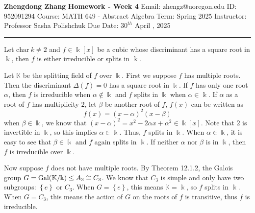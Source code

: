 \documentclass[a4paper, 12pt]{article}
\begin{document}
\noindent

\large\textbf{Zhengdong Zhang} \hfill \textbf{Homework - Week 4}
Email: zhengz@uoregon.edu \hfill ID: 952091294
\normalsize Course: MATH 649 - Abstract Algebra \hfill Term: Spring 2025
Instructor: Professor Sasha Polishchuk \hfill Due Date: $30^{th}$ April , 2025 
\noindent\rule{7in}{2.8pt}

\begin{problem}{12.16}
Let \(\text{char}\  k\neq 2\) and \(f\in \Bbbk[x]\) be a cubic whose discriminant has a square root in \(\Bbbk\), then \(f\) is either irreducible or splits in \(\Bbbk\).
\end{problem}
\begin{solution}
Let \(\mathbb{K}\) be the splitting field of \(f\) over \(\Bbbk\). First we suppose \(f\) has multiple roots. Then the discriminant \(\Delta(f)=0\) has a square root in \(\Bbbk\). If \(f\) has only one root \(\alpha\), 
then \(f\) is irreducible when \(\alpha\notin \Bbbk\) and \(f\) splits in \(\Bbbk\) when \(\alpha\in \Bbbk\). If \(\alpha\) as a root of \(f\) has multiplicity \(2\), let \(\beta\) be another root of \(f\), \(f(x)\) can be written as 
\[f(x)=(x-\alpha)^2(x-\beta)\] 
when \(\beta\in \Bbbk\), we know that \((x-\alpha)^2=x^2-2\alpha x+\alpha^2\in \Bbbk[x]\). Note that \(2\) is invertible in \(\Bbbk\), so this implies \(\alpha\in \Bbbk\). Thus, \(f\) splits in \(\Bbbk\). When \(\alpha\in \Bbbk\), it is easy to see that \(\beta\in \Bbbk\) and \(f\) again splits in \(\Bbbk\). 
If neither \(\alpha\) nor \(\beta\) is in \(\Bbbk\), then \(f\) is irreducible over \(\Bbbk\).

Now suppose \(f\) does not have multiple roots. By Theorem 12.1.2, the Galois group \(G=\text{Gal}(\mathbb{K}/\Bbbk)\leq A_3\cong C_3\). We know that \(C_3\) is simple and only have two subgroups: \(\left\{ e \right\}\) or \(C_3\). When \(G=\left\{ e \right\}\), this means \(\mathbb{K}=\Bbbk\), so \(f\) splits in \(\Bbbk\). 
When \(G=C_3\), this means the action of \(G\) on the roots of \(f\) is transitive, thus \(f\) is irreducible. 
\end{solution}
\end{document}
